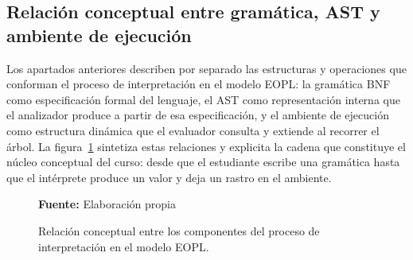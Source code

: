 \subsection{Relación conceptual entre gramática, AST y ambiente de ejecución}

Los apartados anteriores describen por separado las estructuras y operaciones que conforman el proceso de interpretación en el modelo EOPL: la gramática BNF como especificación formal del lenguaje, el AST como representación interna que el analizador produce a partir de esa especificación, y el ambiente de ejecución como estructura dinámica que el evaluador consulta y extiende al recorrer el árbol. La figura~\ref{fig:pipeline-interpretacion} sintetiza estas relaciones y explicita la cadena que constituye el núcleo conceptual del curso: desde que el estudiante escribe una gramática hasta que el intérprete produce un valor y deja un rastro en el ambiente.

\begin{figure}[htbp]
\centering
{}
\caption{Relación conceptual entre los componentes del proceso de interpretación en el modelo EOPL.}
\scriptsize \textbf{Fuente:} Elaboración propia
\label{fig:pipeline-interpretacion}
\end{figure}

